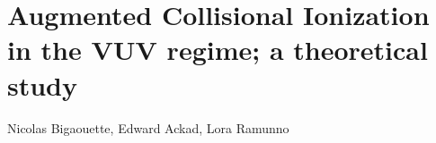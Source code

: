 
\newcommand{\PaperTitleHundrednm}{Augmented Collisional Ionization in the VUV regime; a theoretical study}

\section{\PaperTitleHundrednm}
\label{section:papers:100nm}

\begin{flushright}
Nicolas Bigaouette, Edward Ackad, Lora Ramunno
\end{flushright}



